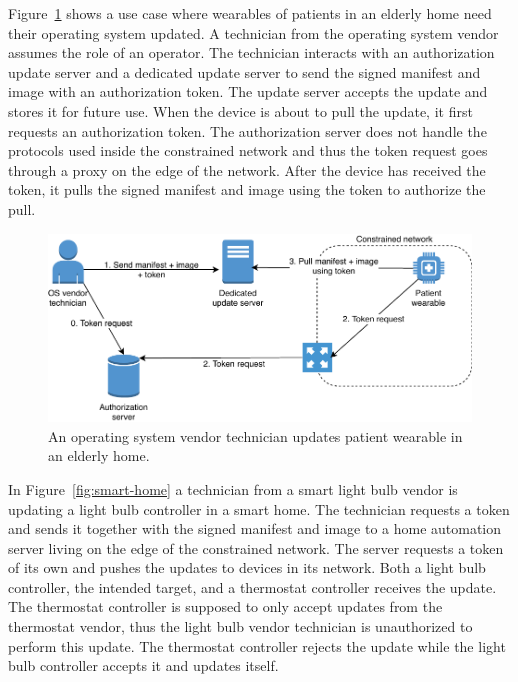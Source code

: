 \documentclass[0-thesis.tex]{subfiles}
\begin{document}
Figure~\ref{fig:elderly-home} shows a use case where wearables of patients in an elderly
home need their operating system updated. A technician from the operating system vendor
assumes the role of an operator. The technician interacts with an authorization update
server and a dedicated update server to send the signed manifest and image with an
authorization token. The update server accepts the update and stores it for future use.
When the device is about to pull the update, it first requests an authorization token. The
authorization server does not handle the protocols used inside the constrained network and
thus the token request goes through a proxy on the edge of the network. After the device
has received the token, it pulls the signed manifest and image using the token to
authorize the pull.

\begin{figure}
    \caption{An operating system vendor technician updates patient wearable in an elderly home.}
    \label{fig:elderly-home}
    \includegraphics{images/use-case-elderly-home.pdf}
\end{figure}

In Figure~\ref{fig:smart-home} a technician from a smart light bulb vendor is updating a
light bulb controller in a smart home. The technician requests a token and sends it
together with the signed manifest and image to a home automation server living on the edge
of the constrained network. The server requests a token of its own and pushes the updates
to devices in its network. Both a light bulb controller, the intended target, and a
thermostat controller receives the update. The thermostat controller is supposed to only
accept updates from the thermostat vendor, thus the light bulb vendor technician is
unauthorized to perform this update. The thermostat controller rejects the update while
the light bulb controller accepts it and updates itself.
\end{document}
